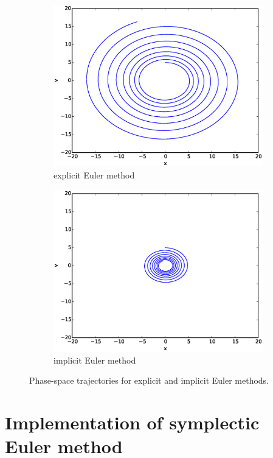\documentclass{article}
\theoremstyle{definition}
\renewcommand{\>}{\rangle}
\newcommand{\<}{\langle}
\begin{document}
\begin{figure}\centering
\begin{subfigure}{0.48\textwidth}
\includegraphics[width=\textwidth]{explicit_xv.eps}
\caption{explicit Euler method}
\end{subfigure}
\begin{subfigure}{0.48\textwidth}
\includegraphics[width=\textwidth]{implicit_xv.eps}
\caption{implicit Euler method}
\end{subfigure}
\caption{\label{fig:Euler_xv}Phase-space trajectories for explicit and implicit
Euler methods.}
\end{figure}

\section{Implementation of symplectic Euler method}
\end{document}
